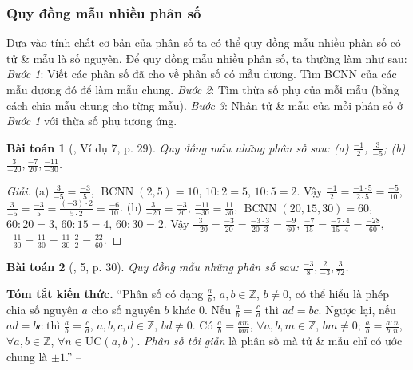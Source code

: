 \documentclass{article}
\newtheorem{baitoan}{Bài toán}
\begin{document}
\subsubsection{Quy đồng mẫu nhiều phân số}
Dựa vào tính chất cơ bản của phân số ta có thể quy đồng mẫu nhiều phân số có tử \& mẫu là số nguyên. Để quy đồng mẫu nhiều phân số, ta thường làm như sau: \textit{Bước 1}: Viết các phân số đã cho về phân số có mẫu dương. Tìm BCNN của các mẫu dương đó để làm mẫu chung. \textit{Bước 2}: Tìm thừa số phụ của mỗi mẫu (bằng cách chia mẫu chung cho từng mẫu). \textit{Bước 3}: Nhân tử \& mẫu của mỗi phân số ở \textit{Bước 1} với thừa số phụ tương ứng.

\begin{baitoan}[\cite{SGK_Toan_6_Canh_Dieu_tap_2}, Ví dụ 7, p. 29]
	Quy đồng mẫu những phân số sau: (a) $\frac{-1}{2}$, $\frac{3}{-5}$; (b) $\frac{3}{-20},\frac{-7}{20},\frac{-11}{-30}$.
\end{baitoan}

\begin{proof}[Giải]
	(a) $\frac{3}{-5} = \frac{-3}{5}$, $\operatorname{BCNN}(2,5) = 10$, $10:2 = 5$, $10:5 = 2$. Vậy $\frac{-1}{2} = \frac{-1\cdot5}{2\cdot5} = \frac{-5}{10}$, $\frac{3}{-5} = \frac{-3}{5} = \frac{(-3)\cdot2}{5\cdot2} = \frac{-6}{10}$. (b) $\frac{3}{-20} = \frac{-3}{20}$, $\frac{-11}{-30} = \frac{11}{30}$, $\operatorname{BCNN}(20,15,30) = 60$, $60:20 = 3$, $60:15 = 4$, $60:30 = 2$. Vậy $\frac{3}{-20} = \frac{-3}{20} = \frac{-3\cdot3}{20\cdot3} = \frac{-9}{60}$, $\frac{-7}{15} = \frac{-7\cdot4}{15\cdot4} = \frac{-28}{60}$, $\frac{-11}{-30} = \frac{11}{30} = \frac{11\cdot2}{30\cdot2} = \frac{22}{60}$.
\end{proof}

\begin{baitoan}[\cite{SGK_Toan_6_Canh_Dieu_tap_2}, 5, p. 30]
	Quy đồng mẫu những phân số sau: $\frac{-3}{8},\frac{2}{-3},\frac{3}{72}$.
\end{baitoan}
\noindent\textsf{\textbf{Tóm tắt kiến thức.}} ``Phân số có dạng $\frac{a}{b}$, $a,b\in\mathbb{Z}$, $b\ne0$, có thể hiểu là phép chia số nguyên $a$ cho số nguyên $b$ khác $0$. Nếu $\frac{a}{b} = \frac{c}{d}$ thì $ad = bc$. Ngược lại, nếu $ad = bc$ thì $\frac{a}{b} = \frac{c}{d}$, $a,b,c,d\in\mathbb{Z}$, $bd\ne0$. Có $\frac{a}{b} = \frac{am}{bm}$, $\forall a,b,m\in\mathbb{Z}$, $bm\ne0$; $\frac{a}{b} = \frac{a:n}{b:n}$, $\forall a,b\in\mathbb{Z}$, $\forall n\in\mbox{ƯC}(a,b)$. \textit{Phân số tối giản} là phân số mà tử \& mẫu chỉ có ước chung là $\pm1$.'' -- \cite[Chap. V, \S1, p. 29]{SBT_Toan_6_Canh_Dieu_tap_2}
\end{document}
